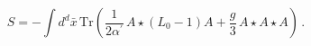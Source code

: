 \begin{equation}
S=-\int d^{d}\bar{x}\,\mathrm{Tr}\left( {\frac{1}{2\alpha ^{\prime }}}%
\,A\star (L_{0}-1)A+{\frac{g}{3}}\,A\star A\star A\right)\,.
\label{eq:MSFT_action}
\end{equation}

